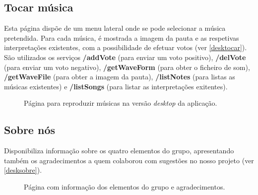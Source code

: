 \subsection{Tocar música}
Esta página dispõe de um menu lateral onde se pode selecionar a música pretendida. Para cada música, é mostrada a imagem da pauta e as respetivas interpretações existentes, com a possibilidade de efetuar votos (ver \autoref{desktocar}). São utilizados os serviços \textbf{/addVote} (para enviar um voto positivo), \textbf{/delVote} (para enviar um voto negativo), \textbf{/getWaveForm} (para obter o ficheiro de som), \textbf{/getWaveFile} (para obter a imagem da pauta), \textbf{/listNotes} (para listas as músicas existentes) e \textbf{/listSongs} (para listar as interpretações exitentes).

\begin{figure}[htp]
\centering
{}
\caption{Página para reproduzir músicas na versão \emph{desktop} da aplicação.}
\label{desktocar}
\end{figure}

\subsection{Sobre nós}
Disponibiliza informação sobre os quatro elementos do grupo, apresentando também os agradecimentos a quem colaborou com sugestões no nosso projeto (ver \autoref{desksobre}).

\begin{figure}[htp]
\centering
{}
\caption{Página com informação dos elementos do grupo e agradecimentos.}
\label{desksobre}
\end{figure}